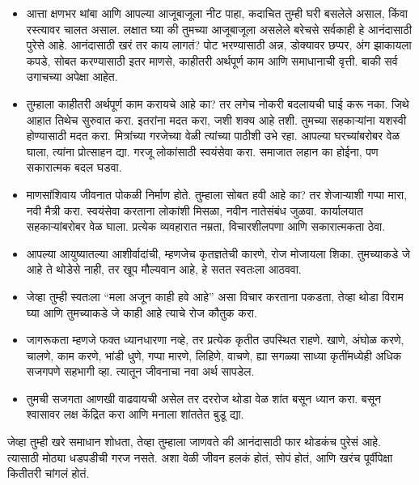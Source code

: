 \begin{itemize}
 \item आत्ता क्षणभर थांबा आणि आपल्या आजूबाजूला नीट पाहा, कदाचित तुम्ही घरी बसलेले असाल,
 किंवा रस्त्यावर चालत असाल.
 लक्षात घ्या की तुमच्या आजूबाजूला असलेले बरेचसे सर्वकाही हे आनंदासाठी पुरेसे आहे.
 आनंदासाठी खरं तर काय लागतं? पोट भरण्यासाठी अन्न, डोक्यावर छप्पर, अंग झाकायला कपडे, सोबत करण्यासाठी इतर माणसे, काहीतरी अर्थपूर्ण काम आणि समाधानाची वृत्ती.
 बाकी सर्व उगाचच्या अपेक्षा आहेत.
\item तुम्हाला काहीतरी अर्थपूर्ण काम करायचे आहे का? तर लगेच नोकरी बदलायची घाई करू नका.
 जिथे आहात तिथेच सुरुवात करा.
 इतरांना मदत करा, जशी शक्य आहे तशी.
 तुमच्या सहकाऱ्यांना यशस्वी होण्यासाठी मदत करा.
 मित्रांच्या गरजेच्या वेळी त्यांच्या पाठीशी उभे रहा.
 आपल्या घरच्यांबरोबर वेळ घाला, त्यांना प्रोत्साहन द्या.
 गरजू लोकांसाठी स्वयंसेवा करा.
 समाजात लहान का होईना, पण सकारात्मक बदल घडवा.
\item माणसांशिवाय जीवनात पोकळी निर्माण होते.
 तुम्हाला सोबत हवी आहे का? तर शेजाऱ्याशी गप्पा मारा, नवी मैत्री करा.
 स्वयंसेवा करताना लोकांशी मिसळा, नवीन नातेसंबंध जुळवा.
 कार्यालयात सहकाऱ्यांबरोबर वेळ घाला.
 प्रत्येक व्यवहारात नम्रता, विचारशीलपणा आणि सकारात्मकता ठेवा.
\item आपल्या आयुष्यातल्या आशीर्वादांची, म्हणजेच कृतज्ञतेची कारणे, रोज मोजायला शिका.
 तुमच्याकडे जे आहे ते थोडेसे नाही, तर खूप मौल्यवान आहे, हे सतत स्वतःला आठववा.
\item जेव्हा तुम्ही स्वतःला “मला अजून काही हवे आहे” असा विचार करताना पकडता,
 तेव्हा थोडा विराम घ्या आणि तुमच्याकडे जे काही आहे त्याचे रोज कौतुक करा.
\item जागरूकता म्हणजे फक्त ध्यानधारणा नव्हे, तर प्रत्येक कृतीत उपस्थित राहणे.
 खाणे, अंघोळ करणे, चालणे, काम करणे, भांडी धुणे, गप्पा मारणे, लिहिणे, वाचणे, 
 ह्या सगळ्या साध्या कृतींमध्येही अधिक सजगपणे सहभागी व्हा.
 त्यातून जीवनाचा नवा अर्थ सापडेल.
\item तुमची सजगता आणखी वाढवायची असेल तर दररोज थोडा वेळ शांत बसून ध्यान करा.
 बसून श्वासावर लक्ष केंद्रित करा आणि मनाला शांततेत बुडू द्या.
 \end{itemize}
जेव्हा तुम्ही खरे समाधान शोधता, तेव्हा तुम्हाला जाणवते की आनंदासाठी फार थोडकंच पुरेसं आहे.
 त्यासाठी मोठ्या धडपडीची गरज नसते.
 अशा वेळी जीवन हलकं होतं, सोपं होतं, आणि खरंच पूर्वीपेक्षा कितीतरी चांगलं होतं.

